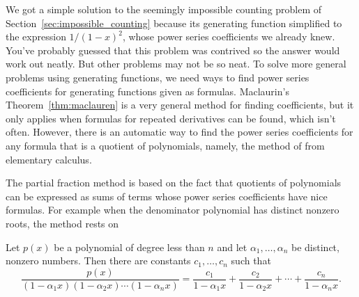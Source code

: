 We got a simple solution to the seemingly impossible counting problem
of Section~\ref{sec:impossible_counting} because its generating
function simplified to the expression $1/(1-x)^2$, whose power series
coefficients we already knew.  You've probably guessed that this
problem was contrived so the answer would work out neatly.  But other
problems may not be so neat.  To solve more general problems using
generating functions, we need ways to find power series coefficients
for generating functions given as formulas.  Maclaurin's
Theorem~\ref{thm:maclauren} is a very general method for finding
coefficients, but it only applies when formulas for repeated
derivatives can be found, which isn't often.  However, there is an
automatic way to find the power series coefficients for any formula
that is a quotient of polynomials, namely, the method of  from elementary calculus.

The partial fraction method is based on the fact that quotients of
polynomials can be expressed as sums of terms whose power series
coefficients have nice formulas.  For example when the denominator
polynomial has distinct nonzero roots, the method rests on
\begin{lemma}\label{lem:partial-fraction-distinct-roots}
  Let $p(x)$ be a polynomial of degree less than $n$ and let
  $\alpha_1, \dots, \alpha_n$ be distinct, nonzero numbers.  Then
  there are constants $c_1,\dots,c_n$ such that
\[
\frac{p(x)}{(1-\alpha_1 x)(1-\alpha_2 x)\cdots(1-\alpha_n x)} =
\frac{c_1}{1-\alpha_1 x} + \frac{c_2}{1-\alpha_2 x} + \cdots +
\frac{c_n}{1-\alpha_n x}.
\]
\end{lemma}

